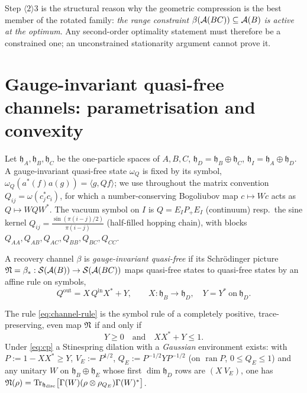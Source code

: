 \documentclass[11pt]{article}
\newcommand{\hh}{\mathfrak h}
\begin{document}
\begin{remark}\label{rem:active}
Step \(\langle2\rangle3\) is the structural reason why the geometric compression
is the best member of the rotated family: \emph{the range constraint
\(\beta(\mathcal A(BC))\subseteq\mathcal A(B)\) is active at the optimum}.  Any second-order
optimality statement must therefore be a constrained one; an unconstrained
stationarity argument cannot prove it.
\end{remark}



\section{Gauge-invariant quasi-free channels: parametrisation and convexity}
\label{sec:qf}

Let \(\hh_A,\hh_B,\hh_C\) be the one-particle spaces of \(A,B,C\),
\(\hh_D=\hh_B\oplus\hh_C\), \(\hh_I=\hh_A\oplus\hh_D\).  A gauge-invariant
quasi-free state \(\omega_Q\) is fixed by its symbol,
\(\omega_Q(a^*(f)a(g))=\langle g,Qf\rangle\); we use throughout the matrix
convention \(Q_{ij}=\omega(c_j^*c_i)\), for which a number-conserving Bogoliubov
map \(c\mapsto Wc\) acts as \(Q\mapsto WQW^*\).  The vacuum symbol on \(I\) is
\(Q=E_IP_+E_I\) (continuum) resp.\ the sine kernel
\(Q_{ij}=\frac{\sin(\pi(i-j)/2)}{\pi(i-j)}\) (half-filled hopping chain), with
blocks \(Q_{AA},Q_{AB},Q_{AC},Q_{BB},Q_{BC},Q_{CC}\).

\begin{definition}\label{def:qf-channel}
A recovery channel \(\beta\) is \emph{gauge-invariant quasi-free} if its
Schr\"odinger picture \(\mathfrak N=\beta_*:\mathcal S(\mathcal A(B))\to\mathcal S(\mathcal A(BC))\)
maps quasi-free states to quasi-free states by an affine rule on symbols,
\begin{equation}\label{eq:channel-rule}
 Q^{\mathrm{out}}=X\,Q^{\mathrm{in}}X^*+Y,\qquad X:\hh_B\to\hh_D,\quad Y=Y^*\ \text{on}\ \hh_D .
\end{equation}
\end{definition}

\begin{proposition}\label{prop:cp}
The rule \eqref{eq:channel-rule} is the symbol rule of a completely positive,
trace-preserving, even map \(\mathfrak N\) if and only if
\begin{equation}\label{eq:cp}
 \boxed{\;Y\ge0\quad\text{and}\quad XX^*+Y\le1 .\;}
\end{equation}
Under \eqref{eq:cp} a Stinespring dilation with a \emph{Gaussian} environment
exists: with \(P:=1-XX^*\ge Y\), \(V_E:=P^{1/2}\), \(Q_E:=P^{-1/2}YP^{-1/2}\)
(on \(\operatorname{ran}P\), \(0\le Q_E\le1\)) and any unitary \(W\) on
\(\hh_B\oplus\hh_E\) whose first \(\dim\hh_D\) rows are \((X\ V_E)\), one has
\(\cN(\rho)=\Tr_{\hh_{\mathrm{disc}}}\bigl[\Gamma(W)(\rho\otimes\rho_{Q_E})\Gamma(W)^*\bigr]\).
\end{proposition}
\end{document}
